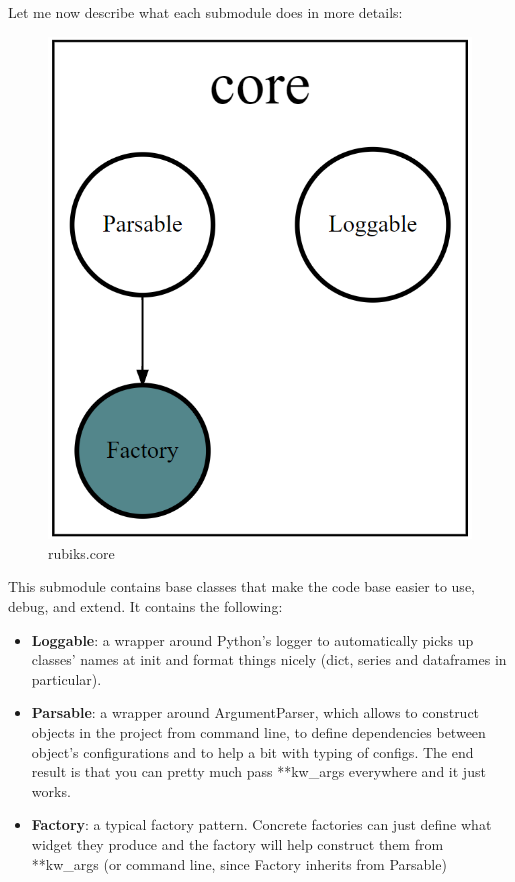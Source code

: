 \noindent Let me now describe what each submodule does in more details:

\begin{figure}[H]
\centering
\includegraphics[scale=0.22]{./Figures/codebasecore}
\caption[Codebase]{rubiks.core}
\label{fig:Codebasecore}
\end{figure}
This submodule contains base classes that make the code base easier to use, debug, and extend. It contains the following:
\begin{itemize}
\item \textbf{Loggable}: a wrapper around Python's logger to automatically picks up classes' names at init and format things nicely (dict, series and dataframes in particular).
\item \textbf{Parsable}: a wrapper around ArgumentParser, which allows to construct objects in the project from command line, to define dependencies between object's configurations and to help a bit with typing of configs. The end result is that you can pretty much pass **kw\_args everywhere and it just works.
\item \textbf{Factory}: a typical factory pattern. Concrete factories can just define what widget they produce and the factory will help construct them from **kw\_args (or command line, since Factory inherits from Parsable)
\end{itemize}



